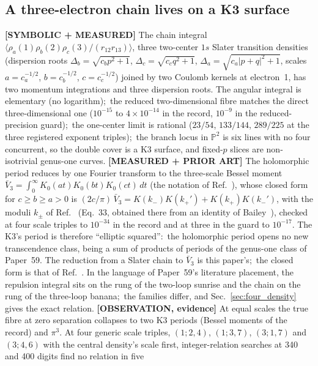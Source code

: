 \documentclass[aps,pra,twocolumn,superscriptaddress,longbibliography]{revtex4-2}
\begin{document}
\subsection{A three-electron chain lives on a K3 surface}
\label{sec:three_electron}

\textbf{[SYMBOLIC + MEASURED]} The chain integral
$\langle \rho_a(1)\rho_b(2)\rho_c(3)/(r_{12}r_{13})\rangle$, three
two-center $1s$ Slater transition densities (dispersion roots
$\Delta_b = \sqrt{c_b p^2 + 1}$, $\Delta_c = \sqrt{c_c q^2 + 1}$,
$\Delta_a = \sqrt{c_a |p+q|^2 + 1}$, scales $a = c_a^{-1/2}$, $b = c_b^{-1/2}$,
$c = c_c^{-1/2}$) joined by two Coulomb kernels at electron~1, has two momentum integrations and three
dispersion roots.  The angular integral is elementary (no logarithm);\
the reduced two-dimensional fibre matches the direct three-dimensional
one ($10^{-15}$ to $4\times10^{-14}$ in the record, $10^{-9}$ in the
reduced-precision guard);\ the one-center limit is rational
($23/54$, $133/144$, $289/225$ at the three registered exponent triples);\
the branch locus in $\mathbb{P}^2$ is six lines with no four concurrent,
so the double cover is a K3 surface, and fixed-$p$ slices are
non-isotrivial genus-one curves.  \textbf{[MEASURED + PRIOR ART]} The
holomorphic period reduces by one Fourier transform to the three-scale
Bessel moment $\bar V_3 = \int_0^\infty K_0(at)K_0(bt)K_0(ct)\,dt$ (the
notation of Ref.~\cite{bbbg2008}), whose closed form for $c \ge b \ge a > 0$
is $(2c/\pi)\,\bar V_3 = K(k_-)K(k_+') + K(k_+)K(k_-')$, with the moduli
$k_\pm$ of Ref.~\cite{bbbg2008} (Eq.~33, obtained there from an identity of
Bailey~\cite{bailey1936}), checked at four scale triples to $10^{-34}$ in
the record and at three in the guard to $10^{-17}$.
The K3's period is therefore ``elliptic squared'':\ the holomorphic period
opens no new transcendence class, being a sum of products of periods of the genus-one class of Paper~59.
The reduction from a Slater chain to $\bar V_3$ is this paper's;\ the closed
form is that of Ref.~\cite{bbbg2008}.  In the language of Paper~59's literature placement, the
repulsion integral sits on the rung of the two-loop sunrise and the chain
on the rung of the three-loop banana;\ the families differ, and
Sec.~\ref{sec:four_density} gives the exact relation.  \textbf{[OBSERVATION, evidence]} At equal scales the
true fibre at zero separation collapses to two K3 periods (Bessel moments
of the record) and $\pi^3$.  At four generic scale triples, $(1;2,4)$,
$(1;3,7)$, $(3;1,7)$ and $(3;4,6)$ with the central density's scale first,
integer-relation searches at 340 and 400 digits find no relation in five
\end{document}
